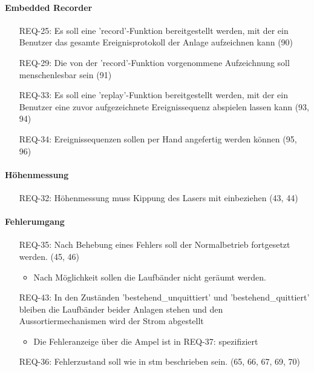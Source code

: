 \paragraph{Embedded Recorder}
\begin{itemize}
    \item[REQ-25:] Es soll eine 'record'-Funktion bereitgestellt werden, mit der ein Benutzer das gesamte Ereignisprotokoll der Anlage aufzeichnen kann (90)
    \item[REQ-29:] Die von der 'record'-Funktion vorgenommene Aufzeichnung soll menschenlesbar sein (91)
    \item[REQ-33:] Es soll eine 'replay'-Funktion bereitgestellt werden, mit der ein Benutzer eine zuvor aufgezeichnete Ereignissequenz abspielen lassen kann (93, 94)
    \item[REQ-34:] Ereignissequenzen sollen per Hand angefertig werden können (95, 96)
\end{itemize}

\paragraph{Höhenmessung}
\begin{itemize}
    \item[REQ-32:] Höhenmessung muss Kippung des Lasers mit einbeziehen (43, 44)
\end{itemize}

\paragraph{Fehlerumgang}
\begin{itemize}
    \item[REQ-35:] Nach Behebung eines Fehlers soll der Normalbetrieb fortgesetzt werden. (45, 46)
    \begin{itemize}
        \item Nach Möglichkeit sollen die Laufbänder nicht geräumt werden.
    \end{itemize}
    \item[REQ-43:] In den Zuständen 'bestehend\_unquittiert' und 'bestehend\_quittiert' bleiben die Laufbänder beider Anlagen stehen und den Aussortiermechanismen wird der Strom abgestellt
    \begin{itemize}
        \item Die Fehleranzeige über die Ampel ist in REQ-37: spezifiziert
    \end{itemize}
    \item[REQ-36:] Fehlerzustand soll wie in stm beschrieben sein. (65, 66, 67, 69, 70)
\end{itemize}